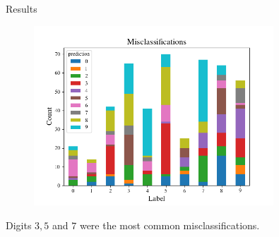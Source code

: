 \documentclass[10pt, t]{beamer}
\begin{document}
\begin{frame}{Results}
	\vspace{-6mm}
	\begin{figure}
		\includegraphics[width = 0.8\textwidth]{images/misclassifications_counts.png}
	\end{figure}
\vspace{-1mm}
Digits $3,5$ and $7$ were the most common misclassifications.
\end{frame}
\end{document}
